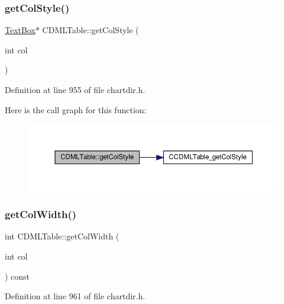 \subsubsection{\texorpdfstring{get\+Col\+Style()}{getColStyle()}}
{\footnotesize\ttfamily \hyperlink{class_text_box}{Text\+Box}$\ast$ C\+D\+M\+L\+Table\+::get\+Col\+Style (\begin{DoxyParamCaption}\item[{int}]{col }\end{DoxyParamCaption})\hspace{0.3cm}{\ttfamily [inline]}}



Definition at line 955 of file chartdir.\+h.

Here is the call graph for this function\+:
\nopagebreak
\begin{figure}[H]
\begin{center}
\leavevmode
\includegraphics[width=350pt]{class_c_d_m_l_table_a66421a52cef917dcf33ab52dcde819af_cgraph}
\end{center}
\end{figure}
\mbox{\label{class_c_d_m_l_table_a9f6a813b023cbce808d94adef12533e6}} 
\subsubsection{\texorpdfstring{get\+Col\+Width()}{getColWidth()}}
{\footnotesize\ttfamily int C\+D\+M\+L\+Table\+::get\+Col\+Width (\begin{DoxyParamCaption}\item[{int}]{col }\end{DoxyParamCaption}) const\hspace{0.3cm}{\ttfamily [inline]}}



Definition at line 961 of file chartdir.\+h.

